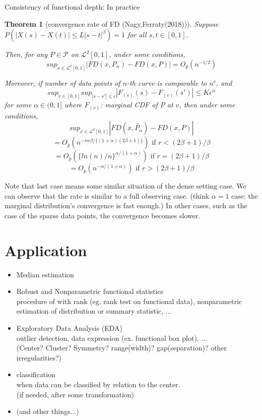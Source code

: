 \documentclass[aspectratio=169,ignorenonframetext,9pt]{beamer}
\theoremstyle{plain}
\newtheorem{thm}{Theorem}[section]
\theoremstyle{definition}
\begin{document}
\begin{frame}{Consistency of functional depth: In practice}
\begin{thm}[convergence rate of FD (Nagy,Ferraty(2018))]
    Suppose $P(|X(s)-X(t)|\leq L|s-t|^\beta)=1$ for all $s,t \in [0,1]$.

    Then, for any $P\in\mathcal{P}$ on $\mathcal{L}^2[0,1]$, under some conditions,
    \[sup_{x\in\mathcal{L}^2[0,1]}|FD(x,P_n)-FD(x,P)|=O_p(n^{-1/2})\]
    
    Moreover, if number of data points of $n$-th curve is comparable to $n^r$, and
    \[sup_{v\in[0,1]} sup_{|s-s'|\leq \epsilon} |F_{(v)}(s)-F_{(v)}(s')|\leq K\epsilon^\alpha\]
    for some $\alpha\in(0,1]$
    where $F_{(v)}$: marginal CDF of $P$ at $v$,
    then under some conditions,
    \[sup_{x\in\mathcal{L}^2[0,1]}|FD(x,\tilde{P_n})-FD(x,P)|\]
    \[=O_p(n^{-r\alpha\beta/\{(1+\alpha)(2\beta+1)\}}) \text{ if } r<(2\beta+1)/\beta\]
    \[=O_p(\{ln(n)/n\}^{\alpha/(1+\alpha)}) \text{ if } r=(2\beta+1)/\beta\]
    \[=O_p(n^{-\alpha/(1+\alpha)}) \text{ if } r>(2\beta+1)/\beta\]
\end{thm}
Note that last case means some similar situation of the dense setting case. 
We can observe that the rate is similar to a full observing case.
(think $\alpha=1$ case: the marginal distribution's convergence is fast enough.)
In other cases, such as the case of the sparse data points, the convergence becomes slower.

\end{frame}





\section{Application}
\begin{itemize}
    \item Median estimation
    \item Robust and Nonparametric functional statistics \\
    procedure of with rank (eg. rank test on functional data), nonparametric estimation of distribution or summary statistic, ...
    \item Exploratory Data Analysis (EDA) \\
    outlier detection, data expression (ex. functional box plot), ...\\
    (Center? Cluster? Symmetry? range(width)? gap(separation)? other irregularities?)
    \item classification \\
    when data can be classified by relation to the center. \\
    (if needed, after some transformation)
    \item (and other things...)
\end{itemize}
\end{document}

